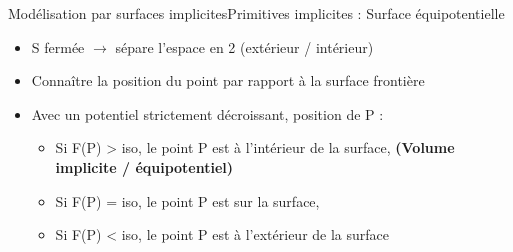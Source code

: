 \documentclass{beamer}
\begin{document}
\begin{frame}[c]{Modélisation par surfaces implicites}{Primitives implicites : Surface équipotentielle}

\begin{itemize}
\item S fermée $\rightarrow$ sépare l'espace en 2 (extérieur / intérieur)
\item Connaître la position du point par rapport à la surface frontière
\item Avec un potentiel strictement décroissant, position de P :
    \begin{itemize}
    \item Si F(P) > iso, le point P est à l'intérieur de la surface,
    \newline \textbf{(Volume implicite / équipotentiel)}
    \item Si F(P) = iso, le point P est sur la surface,
    \item Si F(P) < iso, le point P est à l’extérieur de la surface
    \end{itemize}
\end{itemize}

\end{frame}
\end{document}
